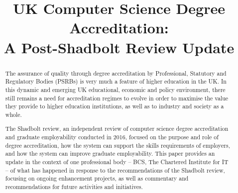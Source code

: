 \documentclass[sigconf]{acmart}
\begin{document}
\title{UK Computer Science Degree Accreditation:\\A Post-Shadbolt
  Review Update}










\renewcommand{\shortauthors}{Crick, Davenport,  Irons, and Prickett}

\begin{abstract}
The assurance of quality through degree accreditation by Professional,
Statutory and Regulatory Bodies (PSRBs) is very much a feature of
higher education in the UK.  In this dynamic and emerging UK
educational, economic and policy environment, there still remains a
need for accreditation regimes to evolve in order to maximise the
value they provide to higher education institutions, as well as to
industry and society as a whole.

The Shadbolt review, an independent review of computer science degree
accreditation and graduate employability conducted in 2016, focused on
the purpose and role of degree accreditation, how the system can
support the skills requirements of employers, and how the system can
improve graduate employability. This paper provides an update in the
context of one professional body -- BCS, The Chartered Institute for
IT -- of what has happened in response to the recommendations of the
Shadbolt review, focusing on ongoing enhancement projects, as well as
commentary and recommendations for future activities and initiatives.
\end{abstract}
\end{document}
